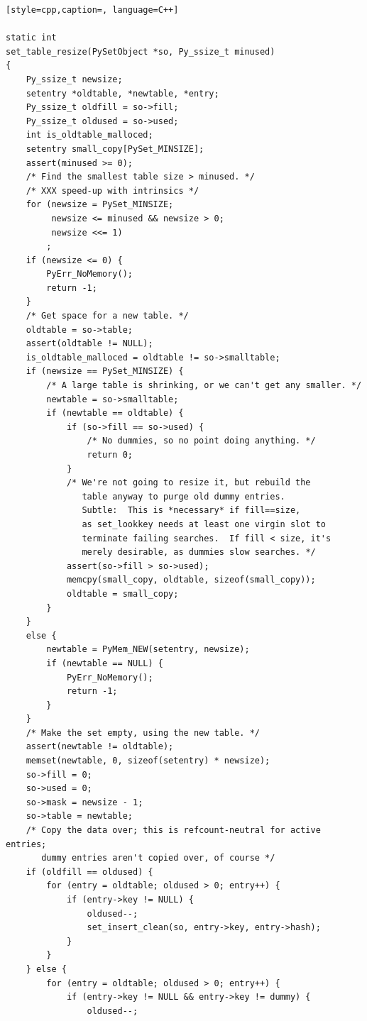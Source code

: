 \begin{lstlisting}[style=cpp,caption=, language=C++]

static int
set_table_resize(PySetObject *so, Py_ssize_t minused)
{
    Py_ssize_t newsize;
    setentry *oldtable, *newtable, *entry;
    Py_ssize_t oldfill = so->fill;
    Py_ssize_t oldused = so->used;
    int is_oldtable_malloced;
    setentry small_copy[PySet_MINSIZE];
    assert(minused >= 0);
    /* Find the smallest table size > minused. */
    /* XXX speed-up with intrinsics */
    for (newsize = PySet_MINSIZE;
         newsize <= minused && newsize > 0;
         newsize <<= 1)
        ;
    if (newsize <= 0) {
        PyErr_NoMemory();
        return -1;
    }
    /* Get space for a new table. */
    oldtable = so->table;
    assert(oldtable != NULL);
    is_oldtable_malloced = oldtable != so->smalltable;
    if (newsize == PySet_MINSIZE) {
        /* A large table is shrinking, or we can't get any smaller. */
        newtable = so->smalltable;
        if (newtable == oldtable) {
            if (so->fill == so->used) {
                /* No dummies, so no point doing anything. */
                return 0;
            }
            /* We're not going to resize it, but rebuild the
               table anyway to purge old dummy entries.
               Subtle:  This is *necessary* if fill==size,
               as set_lookkey needs at least one virgin slot to
               terminate failing searches.  If fill < size, it's
               merely desirable, as dummies slow searches. */
            assert(so->fill > so->used);
            memcpy(small_copy, oldtable, sizeof(small_copy));
            oldtable = small_copy;
        }
    }
    else {
        newtable = PyMem_NEW(setentry, newsize);
        if (newtable == NULL) {
            PyErr_NoMemory();
            return -1;
        }
    }
    /* Make the set empty, using the new table. */
    assert(newtable != oldtable);
    memset(newtable, 0, sizeof(setentry) * newsize);
    so->fill = 0;
    so->used = 0;
    so->mask = newsize - 1;
    so->table = newtable;
    /* Copy the data over; this is refcount-neutral for active entries;
       dummy entries aren't copied over, of course */
    if (oldfill == oldused) {
        for (entry = oldtable; oldused > 0; entry++) {
            if (entry->key != NULL) {
                oldused--;
                set_insert_clean(so, entry->key, entry->hash);
            }
        }
    } else {
        for (entry = oldtable; oldused > 0; entry++) {
            if (entry->key != NULL && entry->key != dummy) {
                oldused--;

\end{lstlisting}
